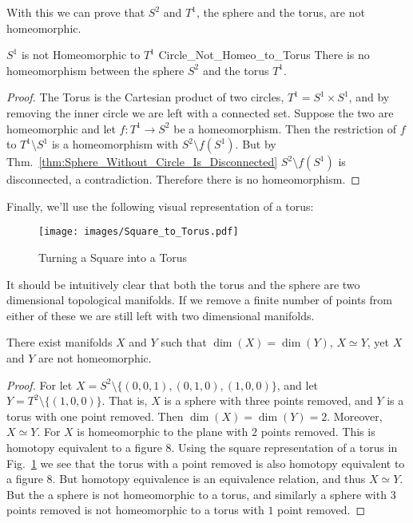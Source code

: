             With this we can prove that $S^{2}$ and $T^{1}$, the sphere and the
            torus, are not homeomorphic.
            \begin{ltheorem}{$S^{1}$ is not Homeomorphic to $T^{1}$}
                            {Circle_Not_Homeo_to_Torus}
                There is no homeomorphism between the sphere $S^{2}$ and
                the torus $T^{1}$.
            \end{ltheorem}
            \begin{proof}
                The Torus is the Cartesian product of two circles,
                $T^{1}=S^{1}\times{S}^{1}$, and by removing the inner circle we
                are left with a connected set. Suppose the two are homeomorphic
                and let $f:T^{1}\rightarrow{S}^{2}$ be a homeomorphism. Then the
                restriction of $f$ to $T^{1}\setminus{S}^{1}$ is a homeomorphism
                with $S^{2}\setminus{f}(S^{1})$. But by
                Thm.~\ref{thm:Sphere_Without_Circle_Is_Disconnected}
                $S^{2}\setminus{f}(S^{1})$ is disconnected, a contradiction.
                Therefore there is no homeomorphism.
            \end{proof}
            Finally, we'll use the following visual representation of a torus:
            \begin{figure}[H]
                \centering
                \captionsetup{type=figure}
                \texttt{[image: images/Square\_to\_Torus.pdf]}
                \caption{Turning a Square into a Torus}
                \label{fig:plane_representation_of_a_torus}
            \end{figure}
            It should be intuitively clear that both the torus and the sphere
            are two dimensional topological manifolds. If we remove a finite
            number of points from either of these we are still left with
            two dimensional manifolds.
            \begin{theorem}
                There exist manifolds $X$ and $Y$ such that
                $\dim(X)=\dim(Y)$, ${X}\simeq{Y}$,
                yet $X$ and $Y$ are not homeomorphic.
            \end{theorem}
            \begin{proof}
                For let $X=S^{2}\setminus\{(0,0,1),(0,1,0),(1,0,0)\}$, and let
                $Y=T^{2}\setminus\{(1,0,0)\}$. That is, $X$ is a sphere with
                three points removed, and $Y$ is a torus with one point removed.
                Then $\dim(X)=\dim(Y)=2$. Moreover, $X\simeq Y$. For $X$ is
                homeomorphic to the plane with $2$ points removed. This is
                homotopy equivalent to a figure $8$. Using the square
                representation of a torus in
                Fig.~\ref{fig:plane_representation_of_a_torus} we see that the
                torus with a point removed is also homotopy equivalent to a
                figure $8$. But homotopy equivalence is an equivalence relation,
                and thus $X\simeq Y$. But the a sphere is not homeomorphic to a
                torus, and similarly a sphere with $3$ points removed is not
                homeomorphic to a torus with $1$ point removed.
            \end{proof}
